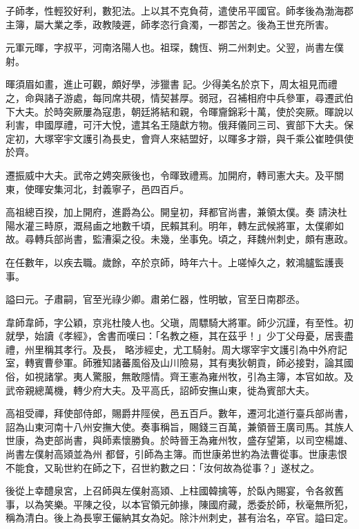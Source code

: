 \begin{pinyinscope}
 子師孝，性輕狡好利，數犯法。上以其不克負荷，遣使吊平國官。師孝後為渤海郡主簿，屬大業之季，政教陵遲，師孝恣行貪濁，一郡苦之。後為王世充所害。



 元軍元暉，字叔平，河南洛陽人也。祖琛，魏恆、朔二州刺史。父翌，尚書左僕射。



 暉須眉如畫，進止可觀，頗好學，涉獵書
 記。少得美名於京下，周太祖見而禮之，命與諸子游處，每同席共硯，情契甚厚。弱冠，召補相府中兵參軍，尋遷武伯下大夫。於時突厥屢為寇患，朝廷將結和親，令暉齎錦彩十萬，使於突厥。暉說以利害，申國厚禮，可汗大悅，遣其名王隨獻方物。俄拜儀同三司、賓部下大夫。保定初，大塚宰宇文護引為長史，會齊人來結盟好，以暉多才辯，與千乘公崔睦俱使於齊。



 遷振威中大夫。武帝之娉突厥後也，令暉致禮焉。加開府，轉司憲大夫。及平關東，使暉安集河北，封義寧子，邑四百戶。



 高祖總百揆，加上開府，進爵為公。開皇初，拜都官尚書，兼領太僕。奏
 請決杜陽水灌三畤原，溉舄鹵之地數千頃，民賴其利。明年，轉左武候將軍，太僕卿如故。尋轉兵部尚書，監漕渠之役。未幾，坐事免。頃之，拜魏州刺史，頗有惠政。



 在任數年，以疾去職。歲餘，卒於京師，時年六十。上嗟悼久之，敕鴻臚監護喪事。



 謚曰元。子肅嗣，官至光祿少卿。肅弟仁器，性明敏，官至日南郡丞。



 韋師韋師，字公穎，京兆杜陵人也。父瑱，周驃騎大將軍。師少沉謹，有至性。初就學，始讀《孝經》，舍書而嘆曰：「名教之極，其在茲乎！」少丁父母憂，居喪盡禮，州里稱其孝行。及長，
 略涉經史，尤工騎射。周大塚宰宇文護引為中外府記室，轉賓曹參軍。師雅知諸蕃風俗及山川險易，其有夷狄朝貢，師必接對，論其國俗，如視諸掌。夷人驚服，無敢隱情。齊王憲為雍州牧，引為主簿，本官如故。及武帝親總萬機，轉少府大夫。及平高氏，詔師安撫山東，徙為賓部大夫。



 高祖受禪，拜使部侍郎，賜爵井陘侯，邑五百戶。數年，遷河北道行臺兵部尚書，詔為山東河南十八州安撫大使。奏事稱旨，賜錢三百萬，兼領晉王廣司馬。其族人世康，為吏部尚書，與師素懷勝負。於時晉王為雍州牧，盛存望第，以司空楊雄、尚書左僕射高熲並為州
 都督，引師為主簿。而世康弟世約為法曹從事。世康恚恨不能食，又恥世約在師之下，召世約數之曰：「汝何故為從事？」遂杖之。



 後從上幸醴泉宮，上召師與左僕射高熲、上柱國韓擒等，於臥內賜宴，令各敘舊事，以為笑樂。平陳之役，以本官領元帥掾，陳國府藏，悉委於師，秋毫無所犯，稱為清白。後上為長寧王儼納其女為妃。除汴州刺史，甚有治名，卒官。謚曰定。




\end{pinyinscope}
